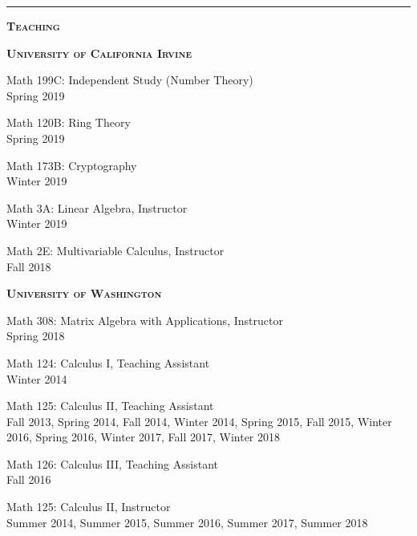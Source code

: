 \documentclass[12pt]{article}
\newcommand{\sectionheading}[1]
{
\bigskip %
\noindent
\hspace{-6.5mm}\textcolor{Gray}{\rule[.75mm]{21.5mm}{1mm}} %
\hspace{.2mm}	%
{\large{\textbf{\textsc{#1}}}} %
}
\newenvironment{date_section}
	{
	\vspace{-1ex}
	\leftmargini = 15ex
		\begin{itemize}[
			labelsep = *,
			labelwidth = 9ex,
			labelindent = 0ex,
			itemindent = !,
			font=\normalfont,
			align=parleft
		]{}
		\itemsep=-1.5mm
	}
	{\end{itemize}\vspace{-2ex}}
\newcommand{\yearmo}[2]{
	\item[
		{\makebox[1ex][r]{#1}}
		\hspace{1ex}
		{\makebox[1ex][l]{#2} }
		] }
\begin{document}
	\sectionheading{Teaching}%

	\begin{date_section}

		\yearmo{}{}\textbf{\textsc{University of California Irvine}}

		\yearmo{}{} Math 199C: Independent Study (Number Theory)
		\\
		Spring 2019

		\yearmo{}{} Math 120B: Ring Theory
		\\
		Spring 2019

		\yearmo{}{} Math 173B: Cryptography
		\\
		Winter 2019

		\yearmo{}{} Math 3A: Linear Algebra, Instructor
		\\
		Winter 2019

		\yearmo{}{} Math 2E: Multivariable Calculus, Instructor
		\\
		Fall 2018

		\yearmo{}{}\textbf{\textsc{University of Washington}}

		\yearmo{}{} Math 308: Matrix Algebra with Applications, Instructor
		\\
		Spring 2018

		\yearmo{}{} Math 124: Calculus I, Teaching Assistant
		\\
		Winter 2014

		\yearmo{}{} Math 125: Calculus II, Teaching Assistant
		\\
		Fall 2013, Spring 2014, Fall 2014, Winter 2014, Spring 2015, Fall 2015, Winter 2016, Spring 2016, Winter 2017, Fall 2017, Winter 2018

		\yearmo{}{} Math 126: Calculus III, Teaching Assistant
		\\
		Fall 2016

		\yearmo{}{} Math 125: Calculus II, Instructor
		\\
		Summer 2014, Summer 2015, Summer 2016, Summer 2017, Summer 2018


\end{date_section}
\end{document}
